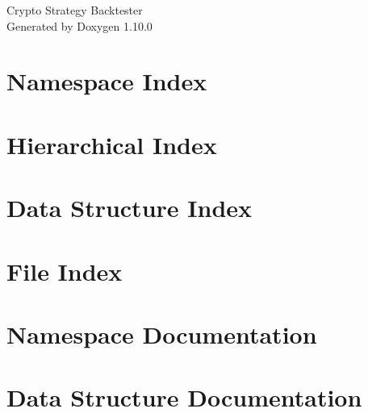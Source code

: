 \documentclass[twoside]{book}
\newcommand{\+}{\discretionary{\mbox{\scriptsize$\hookleftarrow$}}{}{}}
\newcommand{\clearemptydoublepage}{%
    \newpage{\pagestyle{empty}\cleardoublepage}%
  }
\begin{document}
  \raggedbottom
    \hypersetup{pageanchor=false,
                bookmarksnumbered=true,
                pdfencoding=unicode
               }
  \begin{titlepage}
  \vspace*{7cm}
  \begin{center}%
  {\Large Crypto Strategy Backtester}\\
  \vspace*{1cm}
  {\large Generated by Doxygen 1.10.0}\\
  \end{center}
  \end{titlepage}
  \clearemptydoublepage
  \tableofcontents
  \clearemptydoublepage
  \hypersetup{pageanchor=true}

\chapter{Namespace Index}

\chapter{Hierarchical Index}

\chapter{Data Structure Index}

\chapter{File Index}

\chapter{Namespace Documentation}

\chapter{Data Structure Documentation}























\end{document}
